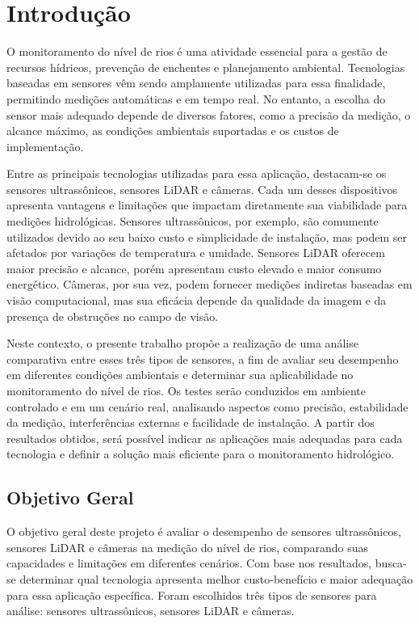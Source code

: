 \chapter{Introdução} \label{cap:intro}

O monitoramento do nível de rios é uma atividade essencial para a gestão de recursos hídricos, prevenção de enchentes e planejamento ambiental. Tecnologias baseadas em sensores vêm sendo amplamente utilizadas para essa finalidade, permitindo medições automáticas e em tempo real. No entanto, a escolha do sensor mais adequado depende de diversos fatores, como a precisão da medição, o alcance máximo, as condições ambientais suportadas e os custos de implementação.

Entre as principais tecnologias utilizadas para essa aplicação, destacam-se os sensores ultrassônicos, sensores LiDAR e câmeras. Cada um desses dispositivos apresenta vantagens e limitações que impactam diretamente sua viabilidade para medições hidrológicas. Sensores ultrassônicos, por exemplo, são comumente utilizados devido ao seu baixo custo e simplicidade de instalação, mas podem ser afetados por variações de temperatura e umidade. Sensores LiDAR oferecem maior precisão e alcance, porém apresentam custo elevado e maior consumo energético. Câmeras, por sua vez, podem fornecer medições indiretas baseadas em visão computacional, mas sua eficácia depende da qualidade da imagem e da presença de obstruções no campo de visão.

Neste contexto, o presente trabalho propõe a realização de uma análise comparativa entre esses três tipos de sensores, a fim de avaliar seu desempenho em diferentes condições ambientais e determinar sua aplicabilidade no monitoramento do nível de rios. Os testes serão conduzidos em ambiente controlado e em um cenário real, analisando aspectos como precisão, estabilidade da medição, interferências externas e facilidade de instalação. A partir dos resultados obtidos, será possível indicar as aplicações mais adequadas para cada tecnologia e definir a solução mais eficiente para o monitoramento hidrológico.

\section{Objetivo Geral}

O objetivo geral deste projeto é avaliar o desempenho de sensores ultrassônicos, sensores LiDAR e câmeras na medição do nível de rios, comparando suas capacidades e limitações em diferentes cenários. Com base nos resultados, busca-se determinar qual tecnologia apresenta melhor custo-benefício e maior adequação para essa aplicação específica.
Foram escolhidos três tipos de sensores para análise: sensores ultrassônicos, sensores LiDAR e câmeras.


